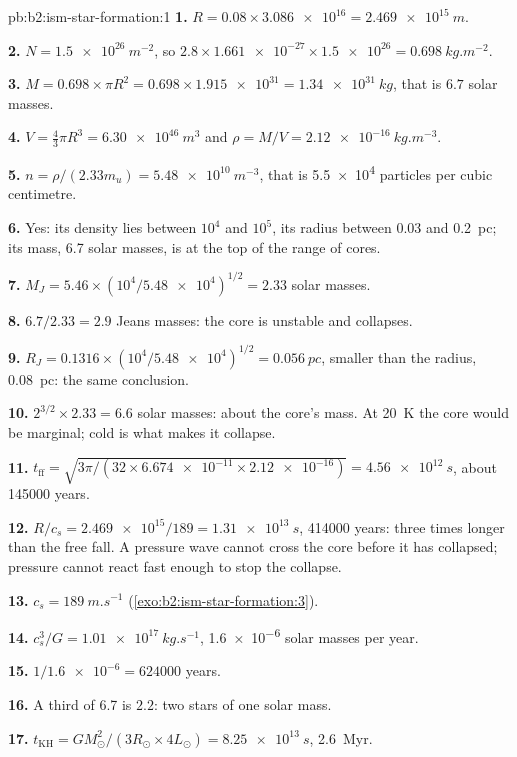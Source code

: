 \begin{solution}{pb:b2:ism-star-formation:1}
\textbf{1.} $R = 0.08\times\num{3.086e16} = \qty{2.469e15}{m}$.

\textbf{2.} $N = \qty{1.5e26}{m^{-2}}$, so $2.8\times\num{1.661e-27}\times\num{1.5e26} =
\qty{0.698}{kg.m^{-2}}$.

\textbf{3.} $M = 0.698\times\pi R^2 = 0.698\times\num{1.915e31} = \qty{1.34e31}{kg}$,
that is $6.7$ solar masses.

\textbf{4.} $V = \tfrac43\pi R^3 = \qty{6.30e46}{m^3}$ and
$\rho = M/V = \qty{2.12e-16}{kg.m^{-3}}$.

\textbf{5.} $n = \rho/(2.33m_u) = \qty{5.48e10}{m^{-3}}$, that is \num{5.5e4} particles
per cubic centimetre.

\textbf{6.} Yes: its density lies between $10^4$ and $10^5$, its radius between 0.03 and
\qty{0.2}{pc}; its mass, 6.7 solar masses, is at the top of the range of cores.

\textbf{7.} $M_J = 5.46\times(10^4/\num{5.48e4})^{1/2} = 2.33$ solar masses.

\textbf{8.} $6.7/2.33 = 2.9$ Jeans masses: the core is unstable and collapses.

\textbf{9.} $R_J = 0.1316\times(10^4/\num{5.48e4})^{1/2} = \qty{0.056}{pc}$, smaller than
the radius, \qty{0.08}{pc}: the same conclusion.

\textbf{10.} $2^{3/2}\times2.33 = 6.6$ solar masses: about the core's mass. At
\qty{20}{K} the core would be marginal; cold is what makes it collapse.

\textbf{11.} $t_{\mathrm{ff}} = \sqrt{3\pi/(32\times\num{6.674e-11}\times\num{2.12e-16})}
= \qty{4.56e12}{s}$, about \num{145000} years.

\textbf{12.} $R/c_s = \num{2.469e15}/189 = \qty{1.31e13}{s}$, \num{414000} years: three
times longer than the free fall. A pressure wave cannot cross the core before it has
collapsed; pressure cannot react fast enough to stop the collapse.

\textbf{13.} $c_s = \qty{189}{m.s^{-1}}$ (\cref{exo:b2:ism-star-formation:3}).

\textbf{14.} $c_s^3/G = \qty{1.01e17}{kg.s^{-1}}$, \num{1.6e-6} solar masses per year.

\textbf{15.} $1/\num{1.6e-6} = \num{624000}$ years.

\textbf{16.} A third of 6.7 is $2.2$: two stars of one solar mass.

\textbf{17.} $t_{\mathrm{KH}} = GM_\odot^2/(3R_\odot\times4L_\odot) = \qty{8.25e13}{s}$,
\qty{2.6}{Myr}.


\end{solution}
